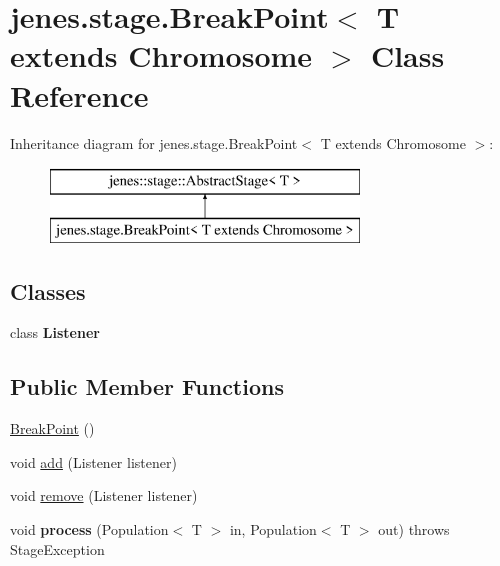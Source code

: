 \hypertarget{classjenes_1_1stage_1_1_break_point_3_01_t_01extends_01_chromosome_01_4}{\section{jenes.\-stage.\-Break\-Point$<$ T extends Chromosome $>$ Class Reference}
\label{classjenes_1_1stage_1_1_break_point_3_01_t_01extends_01_chromosome_01_4}
}
Inheritance diagram for jenes.\-stage.\-Break\-Point$<$ T extends Chromosome $>$\-:\begin{figure}[H]
\begin{center}
\leavevmode
\includegraphics[height=2.000000cm]{classjenes_1_1stage_1_1_break_point_3_01_t_01extends_01_chromosome_01_4}
\end{center}
\end{figure}
\subsection*{Classes}
\begin{DoxyCompactItemize}
\item 
class {\bfseries Listener}
\end{DoxyCompactItemize}
\subsection*{Public Member Functions}
\begin{DoxyCompactItemize}
\item 
\hyperlink{classjenes_1_1stage_1_1_break_point_3_01_t_01extends_01_chromosome_01_4_a242b4e33e148a17a0f2d19e1963aa990}{Break\-Point} ()
\item 
void \hyperlink{classjenes_1_1stage_1_1_break_point_3_01_t_01extends_01_chromosome_01_4_aac70bbcb2e82710fe969bf1545c3a9f4}{add} (Listener listener)
\item 
void \hyperlink{classjenes_1_1stage_1_1_break_point_3_01_t_01extends_01_chromosome_01_4_a367d07e34b42c06b692ec35d0a8f8a40}{remove} (Listener listener)
\item 
\hypertarget{classjenes_1_1stage_1_1_break_point_3_01_t_01extends_01_chromosome_01_4_a2fa0c075727e667e633bb9d3eb2b9e71}{void {\bfseries process} (Population$<$ T $>$ in, Population$<$ T $>$ out)  throws Stage\-Exception }\label{classjenes_1_1stage_1_1_break_point_3_01_t_01extends_01_chromosome_01_4_a2fa0c075727e667e633bb9d3eb2b9e71}

\end{DoxyCompactItemize}


